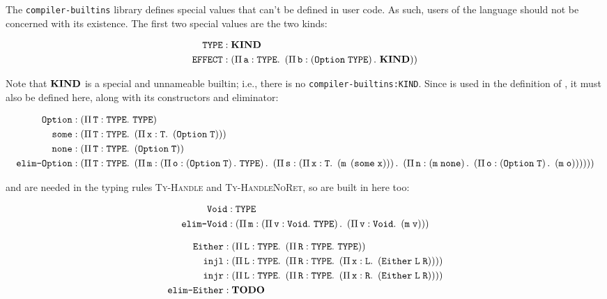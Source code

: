 The \texttt{compiler-builtins} library defines special values that can't be defined in user code.
As such, users of the language should not be concerned with its existence.
The first two special values are the two kinds:

\begin{align}
	\texttt{TYPE} & : \mathbf{KIND} \\
	\texttt{EFFECT} & : \left(\Pi\,\mathit{\texttt{a}}:\texttt{TYPE}.\ \left(\Pi\,\mathit{\texttt{b}}:\left(\texttt{Option}\;\texttt{TYPE}\right).\ \mathbf{KIND}\right)\right)
\end{align}

Note that $\mathbf{KIND}$ is a special and unnameable builtin; i.e., there is no \texttt{compiler-builtins:KIND}.
Since  is used in the definition of , it must also be defined here, along with its constructors and eliminator:

\begin{align}
	\texttt{Option} & : \left(\Pi\,\mathit{\texttt{T}}:\texttt{TYPE}.\ \texttt{TYPE}\right) \\
	\texttt{some} & : \left(\Pi\,\mathit{\texttt{T}}:\texttt{TYPE}.\ \left(\Pi\,\mathit{\texttt{x}}:\texttt{T}.\ \left(\texttt{Option}\;\texttt{T}\right)\right)\right) \\
	\texttt{none} & : \left(\Pi\,\mathit{\texttt{T}}:\texttt{TYPE}.\ \left(\texttt{Option}\;\texttt{T}\right)\right) \\
	\texttt{elim-Option} & : \left(\Pi\,\mathit{\texttt{T}}:\texttt{TYPE}.\ \left(\Pi\,\mathit{\texttt{m}}:\left(\Pi\,\mathit{\texttt{o}}:\left(\texttt{Option}\;\texttt{T}\right).\ \texttt{TYPE}\right).\ \left(\Pi\,\mathit{\texttt{s}}:\left(\Pi\,\mathit{\texttt{x}}:\texttt{T}.\ \left(\texttt{m}\;\left(\texttt{some}\;\texttt{x}\right)\right)\right).\ \left(\Pi\,\mathit{\texttt{n}}:\left(\texttt{m}\;\texttt{none}\right).\ \left(\Pi\,\mathit{\texttt{o}}:\left(\texttt{Option}\;\texttt{T}\right).\ \left(\texttt{m}\;\texttt{o}\right)\right)\right)\right)\right)\right)
\end{align}

 and  are needed in the typing rules \textsc{Ty-Handle} and \textsc{Ty-HandleNoRet}, so are built in here too:

\begin{align}
	\texttt{Void} & : \texttt{TYPE} \\
	\texttt{elim-Void} & : \left(\Pi\,\mathit{\texttt{m}}:\left(\Pi\,\mathit{\texttt{v}}:\texttt{Void}.\ \texttt{TYPE}\right).\ \left(\Pi\,\mathit{\texttt{v}}:\texttt{Void}.\ \left(\texttt{m}\;\texttt{v}\right)\right)\right)
\end{align}

\begin{align}
	\texttt{Either} & : \left(\Pi\,\mathit{\texttt{L}}:\texttt{TYPE}.\ \left(\Pi\,\mathit{\texttt{R}}:\texttt{TYPE}.\ \texttt{TYPE}\right)\right) \\
	\texttt{injl} & : \left(\Pi\,\mathit{\texttt{L}}:\texttt{TYPE}.\ \left(\Pi\,\mathit{\texttt{R}}:\texttt{TYPE}.\ \left(\Pi\,\mathit{\texttt{x}}:\texttt{L}.\ \left(\texttt{\texttt{Either}}\;\texttt{L}\;\texttt{R}\right)\right)\right)\right) \\
	\texttt{injr} & : \left(\Pi\,\mathit{\texttt{L}}:\texttt{TYPE}.\ \left(\Pi\,\mathit{\texttt{R}}:\texttt{TYPE}.\ \left(\Pi\,\mathit{\texttt{x}}:\texttt{R}.\ \left(\texttt{\texttt{Either}}\;\texttt{L}\;\texttt{R}\right)\right)\right)\right) \\
	\texttt{elim-Either} & : \textbf{TODO}
\end{align}

